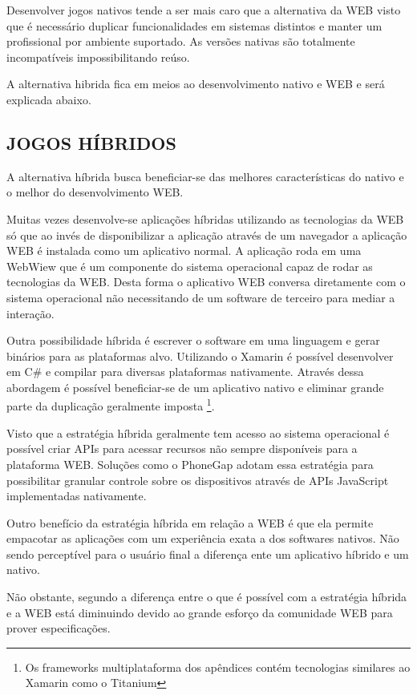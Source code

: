 Desenvolver jogos nativos tende a ser mais caro que a alternativa da WEB
visto que é necessário duplicar funcionalidades em sistemas distintos
e manter um profissional por ambiente suportado. As versões nativas
são totalmente incompatíveis impossibilitando reúso.

A alternativa hibrida fica em meios ao desenvolvimento nativo e WEB e
será explicada abaixo.

\subsection{JOGOS HÍBRIDOS}

A alternativa híbrida busca beneficiar-se das melhores características
do nativo e o melhor do desenvolvimento WEB.

Muitas vezes desenvolve-se aplicações híbridas utilizando as
tecnologias da WEB só que ao invés de disponibilizar a aplicação
através de um navegador a aplicação WEB é instalada como um
aplicativo normal. A aplicação roda em uma WebWiew que é um
componente do sistema operacional capaz de rodar as tecnologias da
WEB. Desta forma o aplicativo WEB conversa diretamente com o sistema
operacional não necessitando de um software de terceiro para mediar a
interação.

Outra possibilidade híbrida é escrever o software em uma linguagem
e gerar binários para as plataformas alvo. Utilizando o Xamarin é
possível desenvolver em C\# e compilar para diversas plataformas
nativamente. Através dessa abordagem é possível beneficiar-se de um
aplicativo nativo e eliminar grande parte da duplicação geralmente
imposta \footnote{Os frameworks multiplataforma dos apêndices contém
tecnologias similares ao Xamarin como o Titanium}.

Visto que a estratégia híbrida geralmente tem acesso ao sistema
operacional é possível criar APIs para acessar recursos não sempre
disponíveis para a plataforma WEB. Soluções como o PhoneGap
adotam essa estratégia para possibilitar granular controle sobre os
dispositivos através de APIs JavaScript implementadas nativamente.

Outro benefício da estratégia híbrida em relação a WEB é que
ela permite empacotar as aplicações com um experiência exata a dos
softwares nativos. Não sendo perceptível para o usuário final a
diferença ente um aplicativo híbrido e um nativo.

Não obstante, segundo \cite[pp. 8]{aSeriousContender} a diferença
entre o que é possível com a estratégia híbrida e a WEB está
diminuindo devido ao grande esforço da comunidade WEB para prover
especificações.

